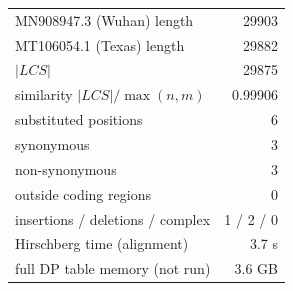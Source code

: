 \begin{tabular}{lr}
\hline
MN908947.3 (Wuhan) length & 29903 \\
MT106054.1 (Texas) length & 29882 \\
$|LCS|$ & 29875 \\
similarity $|LCS| / \max(n, m)$ & 0.99906 \\
substituted positions & 6 \\
\quad synonymous & 3 \\
\quad non-synonymous & 3 \\
\quad outside coding regions & 0 \\
insertions / deletions / complex & 1 / 2 / 0 \\
Hirschberg time (alignment) & 3.7 s \\
full DP table memory (not run) & 3.6 GB \\
\hline
\end{tabular}